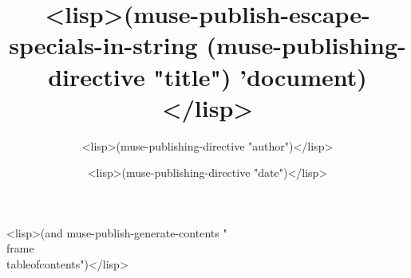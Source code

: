 \documentclass[ignorenonframetext]{beamer}
\title{<lisp>(muse-publish-escape-specials-in-string
  (muse-publishing-directive "title") 'document)</lisp>}
\author{<lisp>(muse-publishing-directive "author")</lisp>}
\date{<lisp>(muse-publishing-directive "date")</lisp>}
\begin{document}
\frame{\titlepage}

<lisp>(and muse-publish-generate-contents
           "\\frame{\\tableofcontents}")</lisp>
\end{document}
